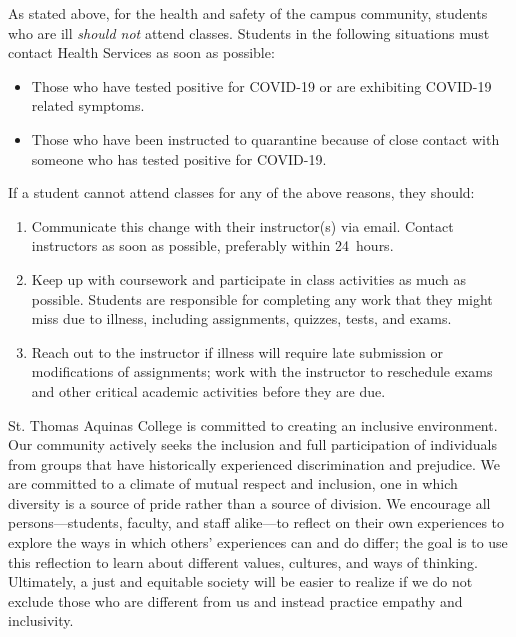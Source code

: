\documentclass[11pt,letterpaper]{article}
\begin{document}
 \par

As stated above, for the health and safety of the campus community, students who are ill {\itshape should not} attend classes. Students in the following situations must contact Health Services as soon as possible: 

	\begin{itemize}
	\item Those who have tested positive for COVID-19 or are exhibiting COVID-19 related symptoms. 
	\item Those who have been instructed to quarantine because of close contact with someone who has tested positive for COVID-19.
	\end{itemize}

If a student cannot attend classes for any of the above reasons, they should:

	\begin{enumerate}[1.]
	\item Communicate this change with their instructor(s) via email. Contact instructors as soon as possible, preferably within 24~hours.
	\item Keep up with coursework and participate in class activities as much as possible. Students are responsible for completing any work that they might miss due to illness, including assignments, quizzes, tests, and exams.
	\item Reach out to the instructor if illness will require late submission or modifications of assignments; work with the instructor to reschedule exams and other critical academic activities before they are due.
	\end{enumerate}
\sectionbreak




St. Thomas Aquinas College is committed to creating an inclusive environment. Our community actively seeks the inclusion and full participation of individuals from groups that have historically experienced discrimination and prejudice. We are committed to a climate of mutual respect and inclusion, one in which diversity is a source of pride rather than a source of division. We encourage all persons---students, faculty, and staff alike---to reflect on their own experiences to explore the ways in which others' experiences can and do differ; the goal is to use this reflection to learn about different values, cultures, and ways of thinking. Ultimately, a just and equitable society will be easier to realize if we do not exclude those who are different from us and instead practice empathy and inclusivity. \pspace
\end{document}
